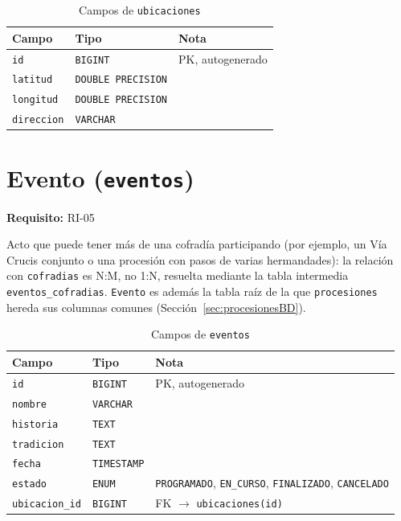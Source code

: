 \begin{table}[H]
\centering
\begin{tabular}{|l|l|p{7cm}|}
\hline
\textbf{Campo} & \textbf{Tipo} & \textbf{Nota} \\
\hline
\texttt{id} & \texttt{BIGINT} & PK, autogenerado \\
\hline
\texttt{latitud} & \texttt{DOUBLE PRECISION} &  \\
\hline
\texttt{longitud} & \texttt{DOUBLE PRECISION} &  \\
\hline
\texttt{direccion} & \texttt{VARCHAR} &  \\
\hline
\end{tabular}
\caption{Campos de \texttt{ubicaciones}}
\end{table}

\section{Evento (\texttt{eventos})}\label{sec:eventosBD}
\textbf{Requisito:} RI-05

Acto que puede tener más de una cofradía participando (por ejemplo, un Vía Crucis conjunto o una procesión con pasos de varias hermandades): la relación con \texttt{cofradias} es N:M, no 1:N, resuelta mediante la tabla intermedia \texttt{eventos\_cofradias}. \texttt{Evento} es además la tabla raíz de la que \texttt{procesiones} hereda sus columnas comunes (Sección~\ref{sec:procesionesBD}).

\begin{table}[H]
\centering
\begin{tabular}{|l|l|p{7cm}|}
\hline
\textbf{Campo} & \textbf{Tipo} & \textbf{Nota} \\
\hline
\texttt{id} & \texttt{BIGINT} & PK, autogenerado \\
\hline
\texttt{nombre} & \texttt{VARCHAR} &  \\
\hline
\texttt{historia} & \texttt{TEXT} &  \\
\hline
\texttt{tradicion} & \texttt{TEXT} &  \\
\hline
\texttt{fecha} & \texttt{TIMESTAMP} &  \\
\hline
\texttt{estado} & \texttt{ENUM} & \texttt{PROGRAMADO}, \texttt{EN\_CURSO}, \texttt{FINALIZADO}, \texttt{CANCELADO} \\
\hline
\texttt{ubicacion\_id} & \texttt{BIGINT} & FK $\to$ \texttt{ubicaciones(id)} \\
\hline
\end{tabular}
\caption{Campos de \texttt{eventos}}
\end{table}


